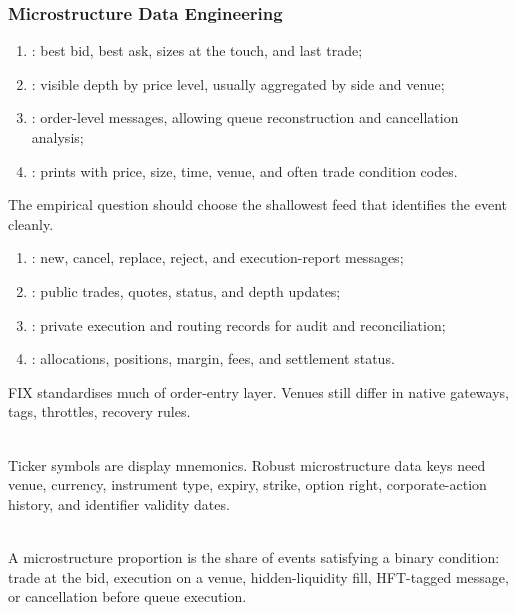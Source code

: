 \subsubsection{Microstructure Data Engineering}

\begin{taxonomy} 
\begin{enumerate}[label=\roman*.]
\setlength{\itemsep}{0pt}
\item {}: best bid, best ask, sizes at the touch, and last trade;
\item {}: visible depth by price level, usually aggregated by side and venue;
\item {}: order-level messages, allowing queue reconstruction and cancellation analysis;
\item {}: prints with price, size, time, venue, and often trade condition codes.
\end{enumerate}
The empirical question should choose the shallowest feed that identifies the event cleanly.
\end{taxonomy}

\begin{taxonomy} 
\begin{enumerate}[label=\roman*.]
\setlength{\itemsep}{0pt}
\item {}: new, cancel, replace, reject, and execution-report messages;
\item {}: public trades, quotes, status, and depth updates;
\item {}: private execution and routing records for audit and reconciliation;
\item {}: allocations, positions, margin, fees, and settlement status.
\end{enumerate}
FIX standardises much of order-entry layer. Venues still differ in native gateways, tags, throttles, recovery rules.
\end{taxonomy}

\begin{caveat} \\
Ticker symbols are display mnemonics. Robust microstructure data keys need venue, currency, instrument type, expiry, strike, option right, corporate-action history, and identifier validity dates.
\end{caveat}

\begin{definition} \\
A microstructure proportion is the share of events satisfying a binary condition: trade at the bid, execution on a venue, hidden-liquidity fill, HFT-tagged message, or cancellation before queue execution.
\end{definition}

